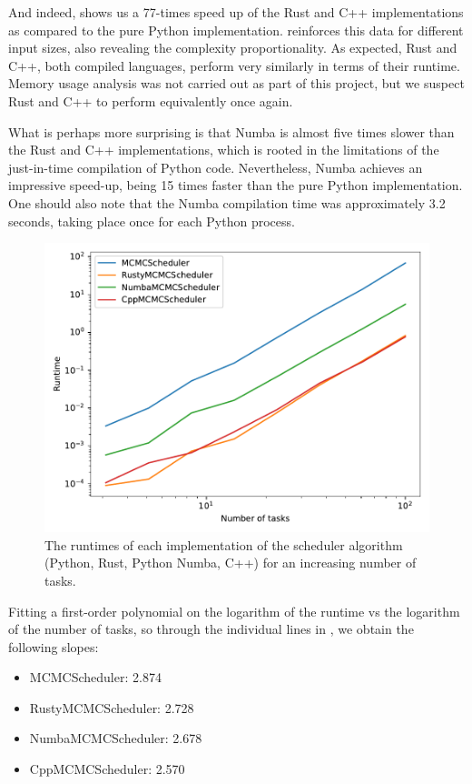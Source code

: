 And indeed,  shows us a 77-times speed up of the Rust and C++ implementations as compared to the pure Python implementation.
 reinforces this data for different input sizes, also revealing the complexity proportionality.
As expected, Rust and C++, both compiled languages, perform very similarly in terms of their runtime.
Memory usage analysis was not carried out as part of this project, but we suspect Rust and C++ to perform equivalently once again.

What is perhaps more surprising is that Numba is almost five times slower than the Rust and C++ implementations, which is rooted in the limitations of the just-in-time compilation of Python code.
Nevertheless, Numba achieves an impressive speed-up, being 15 times faster than the pure Python implementation.
One should also note that the Numba compilation time was approximately 3.2 seconds, taking place once for each Python process.

\begin{figure}[H]
  \centering
  \includegraphics[width=0.68\linewidth]{results/complexity.pdf}
  \caption{The runtimes of each implementation of the scheduler algorithm (Python, Rust, Python Numba, C++) for an increasing number of tasks.}
  \label{fig:complexity}
\end{figure}

Fitting a first-order polynomial on the logarithm of the runtime vs the logarithm of the number of tasks, so through the individual lines in , we obtain the following slopes:

\begin{itemize}
  \tightlist
  \item MCMCScheduler: 2.874
  \item RustyMCMCScheduler: 2.728
  \item NumbaMCMCScheduler: 2.678
  \item CppMCMCScheduler: 2.570
\end{itemize}


